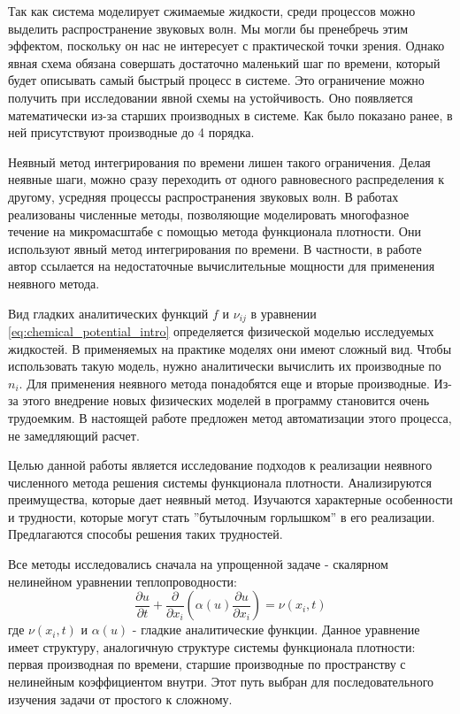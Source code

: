 \documentclass[a4paper,12pt]{article}
\begin{document}
Так как система моделирует сжимаемые жидкости, среди процессов можно выделить распространение звуковых волн. Мы могли бы пренебречь этим эффектом, поскольку он нас не интересует с практической точки зрения. 
Однако явная схема обязана совершать достаточно маленький шаг по времени, который будет описывать самый быстрый процесс в системе. Это ограничение можно получить при исследовании явной схемы на устойчивость. Оно появляется математически из-за старших производных в системе. Как было показано ранее, в ней присутствуют производные до 4 порядка.
\par
Неявный метод интегрирования по времени лишен такого ограничения. Делая неявные шаги, можно сразу переходить от одного равновесного распределения к другому, усредняя процессы распространения звуковых волн. В работах \cite{kudinov, dhd_spe} реализованы численные методы, позволяющие моделировать многофазное течение на микромасштабе с помощью метода функционала плотности. Они используют явный метод интегрирования по времени. В частности, в работе \cite{kudinov} автор ссылается на недостаточные вычислительные мощности для применения неявного метода. 
\par
Вид гладких аналитических функций $f$ и $\nu_{ij}$ в уравнении \eqref{eq:chemical_potential_intro} определяется физической моделью исследуемых жидкостей. В применяемых на практике моделях они имеют сложный вид. Чтобы использовать такую модель, нужно аналитически вычислить их производные по $n_i$. Для применения неявного метода понадобятся еще и вторые производные. Из-за этого внедрение новых физических моделей в программу становится очень трудоемким. В настоящей работе предложен метод автоматизации этого процесса, не замедляющий расчет.
\par
Целью данной работы является исследование подходов к реализации неявного численного метода решения системы функционала плотности. Анализируются преимущества, которые дает неявный метод. Изучаются характерные особенности и трудности, которые могут стать ''бутылочным горлышком'' в его реализации. Предлагаются способы решения таких трудностей. 
\par
Все методы исследовались сначала на упрощенной задаче - скалярном нелинейном уравнении теплопроводности:
\begin{equation} \label{eq:heat_equation_intro}
\frac{\partial u}{\partial t}+ \frac{\partial }{\partial x_i} \left( \alpha (u) \frac{\partial u}{\partial x_i} \right) = \nu(x_i, t)
\end{equation}
где $\nu(x_i, t)$ и $\alpha(u)$ - гладкие аналитические функции. Данное уравнение имеет структуру, аналогичную структуре системы функционала плотности: первая производная по времени, старшие производные по пространству с нелинейным коэффициентом внутри. Этот путь выбран для последовательного изучения задачи от простого к сложному.
\end{document}
